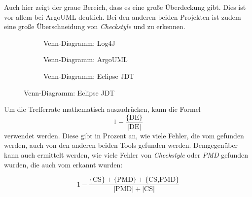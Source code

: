 Auch hier zeigt der graue Bereich, dass es eine große Überdeckung gibt. Dies ist vor allem bei ArgoUML deutlich. Bei den anderen beiden Projekten ist zudem eine große Überschneidung von \textit{Checkstyle} und \doceval zu erkennen.



\begin{figure}[ht!]

   \begin{subfigure}[b]{0.6\textwidth}
    \centering

    \caption{Venn-Diagramm: Log4J}
    \label{fig:log4j_venn}
\end{subfigure}
\hfill
\begin{subfigure}[b]{0.6\textwidth}
    \centering

    \caption{Venn-Diagramm: ArgoUML}
    \label{fig:argo_venn}
\end{subfigure}
\hspace{10cm}
\begin{subfigure}[b]{0.6\textwidth}
    \centering

    \caption{Venn-Diagramm: Eclipse \ac{JDT}}
    \label{fig:eclipse_venn}
\end{subfigure}
\end{figure}
\clearpage
Um die Trefferrate mathematisch auszudrücken, kann die Formel
\begin{equation}\label{eq1}
    1-\frac{\text{\{DE\}}}{|\text{DE}|}
\end{equation} verwendet werden. Diese gibt in Prozent an, wie viele Fehler, die vom \doceval gefunden werden, auch von den anderen beiden Tools gefunden werden. Demgegenüber kann auch ermittelt werden, wie viele Fehler von \textit{Checkstyle} oder \textit{PMD} gefunden wurden, die auch vom \doceval erkannt wurden:

\begin{equation}\label{eq2}
    1-\frac{\text{\{CS\}}+\text{\{PMD\}}+\text{\{CS,PMD\}}}{|\text{PMD}|+|\text{CS}|}
\end{equation}

